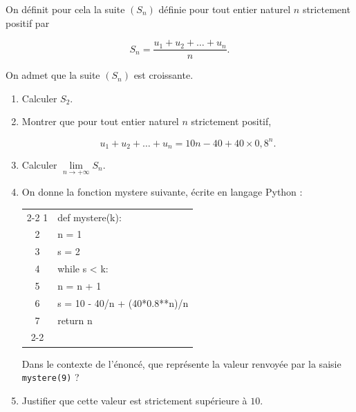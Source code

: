 \documentclass[10pt]{article}
\begin{document}
On définit pour cela la suite $\left(S_n\right)$ définie pour tout entier naturel $n$ strictement positif par

\[S_n = \frac{u_1 + u_2 + \dots + u_n}{n}.\]

On admet que la suite $\left(S_n\right)$ est croissante.

\medskip

\begin{enumerate}
\item Calculer $S_2$.
\item Montrer que pour tout entier naturel $n$ strictement positif,

\[u_1 + u_2 + \dots + u_n = 10n - 40 + 40 \times 0{,}8^n.\]

\item Calculer $\lim\limits_{n \to +\infty} S_n$.
\item On donne la fonction mystere suivante, écrite en langage Python :

\begin{center}
\begin{tabular}{c|l|}\cline{2-2}
1&def mystere(k):\\
2&\quad n = 1\\
3&\quad s = 2\\
4&\quad while s < k:\\
5&\quad\qquad n = n + 1\\
6&\quad\qquad s = 10 - 40/n + (40*0.8**n)/n\\
7&\quad return n\\ \cline{2-2}
\end{tabular}
\end{center}

Dans le contexte de l'énoncé, que représente la valeur renvoyée par la saisie \texttt{mystere(9)} ? 
\item Justifier que cette valeur est strictement supérieure à $10$.
\end{enumerate}
\end{document}
